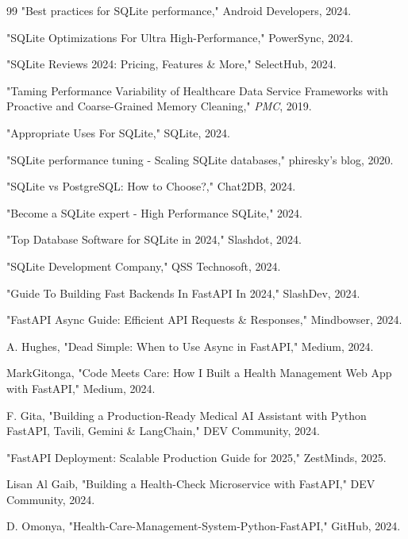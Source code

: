 \documentclass[conference]{IEEEtran}
\begin{document}
\begin{thebibliography}{99}
"Best practices for SQLite performance," Android Developers, 2024.

"SQLite Optimizations For Ultra High-Performance," PowerSync, 2024.

"SQLite Reviews 2024: Pricing, Features \& More," SelectHub, 2024.

"Taming Performance Variability of Healthcare Data Service Frameworks with Proactive and Coarse-Grained Memory Cleaning," \textit{PMC}, 2019.

"Appropriate Uses For SQLite," SQLite, 2024.

"SQLite performance tuning - Scaling SQLite databases," phiresky's blog, 2020.

"SQLite vs PostgreSQL: How to Choose?," Chat2DB, 2024.

"Become a SQLite expert - High Performance SQLite," 2024.

"Top Database Software for SQLite in 2024," Slashdot, 2024.

"SQLite Development Company," QSS Technosoft, 2024.

"Guide To Building Fast Backends In FastAPI In 2024," SlashDev, 2024.

"FastAPI Async Guide: Efficient API Requests \& Responses," Mindbowser, 2024.

A. Hughes, "Dead Simple: When to Use Async in FastAPI," Medium, 2024.

MarkGitonga, "Code Meets Care: How I Built a Health Management Web App with FastAPI," Medium, 2024.

F. Gita, "Building a Production-Ready Medical AI Assistant with Python FastAPI, Tavili, Gemini \& LangChain," DEV Community, 2024.

"FastAPI Deployment: Scalable Production Guide for 2025," ZestMinds, 2025.

Lisan Al Gaib, "Building a Health-Check Microservice with FastAPI," DEV Community, 2024.

D. Omonya, "Health-Care-Management-System-Python-FastAPI," GitHub, 2024.


\end{thebibliography}
\end{document}

